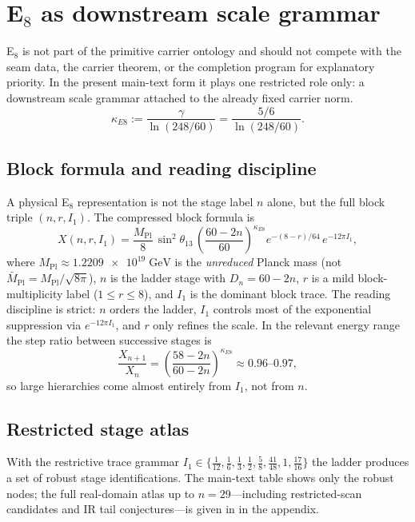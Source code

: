\documentclass[11pt,a4paper]{article}
\theoremstyle{definition}
\theoremstyle{remark}
\newcommand{\Mpl}{\bar M_{\mathrm{Pl}}}
\newcommand{\Mplunred}{M_{\mathrm{Pl}}}
\begin{document}
\section{\texorpdfstring{E$_8$}{E8} as downstream scale grammar}

E$_8$ is not part of the primitive carrier ontology and should not compete with the seam data, the carrier theorem, or the completion program for explanatory priority. In the present main-text form it plays one restricted role only: a downstream scale grammar attached to the already fixed carrier norm.
\[
\kappa_{E8}:=\frac{\gamma}{\ln(248/60)}=\frac{5/6}{\ln(248/60)}.
\]

\subsection{Block formula and reading discipline}

A physical E$_8$ representation is not the stage label $n$ alone, but the full block triple $(n,r,I_1)$. The compressed block formula is
\begin{equation}
\label{eq:e8-block-formula}
X(n,r,I_1)
=
\frac{\Mplunred}{8}\,\sin^2\theta_{13}\,
\left(\frac{60-2n}{60}\right)^{\!\kappa_{E8}}
e^{-(8-r)/64}\,
e^{-12\pi I_1},
\end{equation}
where $\Mplunred\approx\num{1.2209e19}\;\mathrm{GeV}$ is the \emph{unreduced} Planck mass (not $\Mpl=\Mplunred/\sqrt{8\pi}$), $n$ is the ladder stage with $D_n=60-2n$, $r$ is a mild block-multiplicity label ($1\le r\le 8$), and $I_1$ is the dominant block trace. The reading discipline is strict: $n$ orders the ladder, $I_1$ controls most of the exponential suppression via $e^{-12\pi I_1}$, and $r$ only refines the scale. In the relevant energy range the step ratio between successive stages is
\[
\frac{X_{n+1}}{X_n}=\left(\frac{58-2n}{60-2n}\right)^{\!\kappa_{E8}}\approx 0.96\text{--}0.97,
\]
so large hierarchies come almost entirely from $I_1$, not from $n$.

\subsection{Restricted stage atlas}

With the restrictive trace grammar $I_1\in\{\frac{1}{12},\frac{1}{6},\frac{1}{3},\frac{1}{2},\frac{5}{8},\frac{41}{48},1,\frac{17}{16}\}$ the ladder produces a set of robust stage identifications. The main-text table shows only the robust nodes; the full real-domain atlas up to $n=29$---including restricted-scan candidates and IR tail conjectures---is given in  in the appendix.
\end{document}
